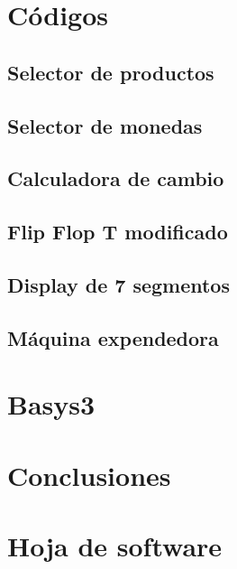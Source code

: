 \documentclass[12pt]{article}  %
\begin{document}
\section{Códigos}
\subsection{Selector de productos}
\subsection{Selector de monedas}
\subsection{Calculadora de cambio}
\subsection{Flip Flop T modificado}
\subsection{Display de 7 segmentos}
\subsection{Máquina expendedora}

\section{Basys3}

\section{Conclusiones}

\newpage %
\appendix %
\section{Hoja de software}


\clearpage %
\end{document}
